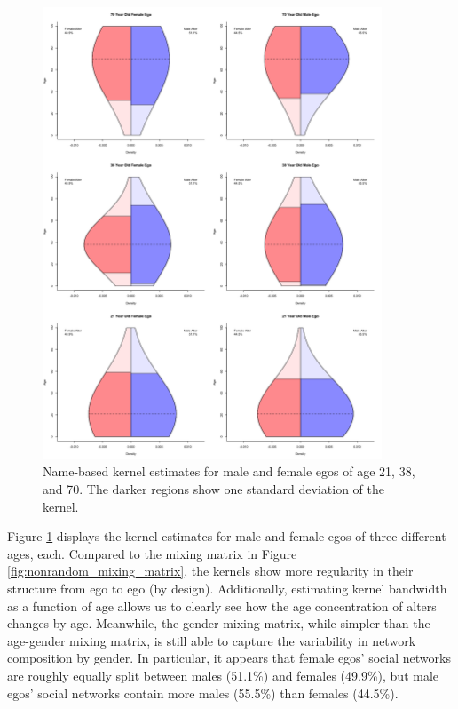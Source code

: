 \begin{figure}
\includegraphics[width=0.9\textwidth]{figures/kernel/names/kern_sexage.png}
\caption{Name-based kernel estimates for male and female egos of age 21, 38, and 70. The darker regions show one standard deviation of the kernel.}
\label{fig:names_kernel_sexage}
\end{figure}

Figure \ref{fig:names_kernel_sexage} displays the kernel estimates for male and female egos of three different ages, each. Compared to the mixing matrix in Figure \ref{fig:nonrandom_mixing_matrix}, the kernels show more regularity in their structure from ego to ego (by design). Additionally, estimating kernel bandwidth as a function of age allows us to clearly see how the age concentration of alters changes by age. Meanwhile, the gender mixing matrix, while simpler than the age-gender mixing matrix, is still able to capture the variability in network composition by gender. In particular, it appears that female egos' social networks are roughly equally split between males (51.1\%) and females (49.9\%), but male egos' social networks contain more males (55.5\%) than females (44.5\%).

